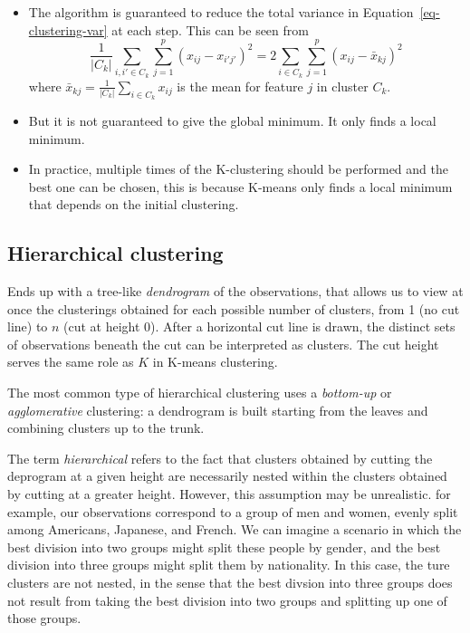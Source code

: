\documentclass[
  letterpaper,
  DIV=11,
  numbers=noendperiod]{scrreprt}
\begin{document}
\begin{itemize}
\item
  The algorithm is guaranteed to reduce the total variance in
  Equation~\ref{eq-clustering-var} at each step. This can be seen from
  \[
  \frac{1}{|C_k|}\sum_{i,i'\in C_k}\sum_{j=1}^p(x_{ij}-x_{i'j'})^2=2\sum_{i\in C_k}\sum_{j=1}^p (x_{ij}-\bar{x}_{kj})^2
  \] where \(\bar{x}_{kj}=\frac{1}{|C_k|}\sum_{i\in C_k}x_{ij}\) is the
  mean for feature \(j\) in cluster \(C_k\).
\item
  But it is not guaranteed to give the global minimum. It only finds a
  local minimum.
\item
  In practice, multiple times of the K-clustering should be performed
  and the best one can be chosen, this is because K-means only finds a
  local minimum that depends on the initial clustering.
\end{itemize}

\subsection{Hierarchical clustering}\label{hierarchical-clustering}

Ends up with a tree-like \emph{dendrogram} of the observations, that
allows us to view at once the clusterings obtained for each possible
number of clusters, from 1 (no cut line) to \(n\) (cut at height 0).
After a horizontal cut line is drawn, the distinct sets of observations
beneath the cut can be interpreted as clusters. The cut height serves
the same role as \(K\) in K-means clustering.

The most common type of hierarchical clustering uses a \emph{bottom-up}
or \emph{agglomerative} clustering: a dendrogram is built starting from
the leaves and combining clusters up to the trunk.

The term \emph{hierarchical} refers to the fact that clusters obtained
by cutting the deprogram at a given height are necessarily nested within
the clusters obtained by cutting at a greater height. However, this
assumption may be unrealistic. for example, our observations correspond
to a group of men and women, evenly split among Americans, Japanese, and
French. We can imagine a scenario in which the best division into two
groups might split these people by gender, and the best division into
three groups might split them by nationality. In this case, the ture
clusters are not nested, in the sense that the best divsion into three
groups does not result from taking the best division into two groups and
splitting up one of those groups.
\end{document}
